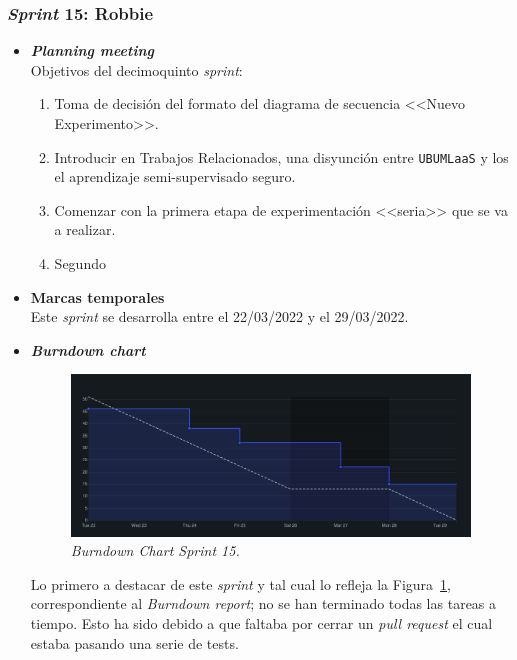 \subsubsection{\textit{Sprint} 15: Robbie}
\begin{itemize}
\item \textbf{\textit{Planning meeting}}\\
Objetivos del decimoquinto \textit{sprint}:
\begin{enumerate}
\item Toma de decisión del formato del diagrama de secuencia <<Nuevo Experimento>>.
\item Introducir en Trabajos Relacionados, una disyunción entre \texttt{UBUMLaaS} y los el aprendizaje semi-supervisado seguro.
\item Comenzar con la primera etapa de experimentación <<seria>> que se va a realizar.
\item Segundo
\end{enumerate}

\item \textbf{Marcas temporales}\\
Este \textit{sprint} se desarrolla entre el 22/03/2022 y el 29/03/2022.

\item \textbf{\textit{Burndown chart}}\\
\begin{figure}
\begin{center}
\includegraphics[width=\textwidth]{../img/anexos/sprints/BD-Sprint15}
\caption{\textit{Burndown Chart Sprint 15.}}\label{fig:BD-Sprint15}
\end{center}
\end{figure}
Lo primero a destacar de este \textit{sprint} y tal cual lo refleja la Figura~\ref{fig:BD-Sprint15}, correspondiente al \textit{Burndown report}; no se han terminado todas las tareas a tiempo. Esto ha sido debido a que faltaba por cerrar un \textit{pull request} el cual estaba pasando una serie de tests.


\end{itemize}
